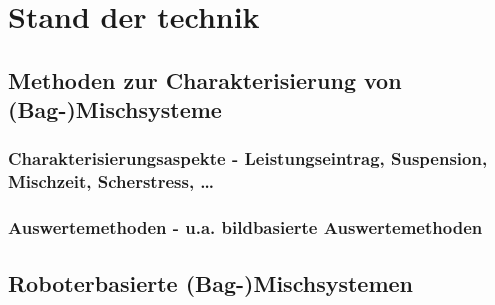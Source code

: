 \chapter{Stand der technik}
\section{Methoden zur Charakterisierung von (Bag-)Mischsysteme}
\subsection{Charakterisierungsaspekte - Leistungseintrag, Suspension, Mischzeit, Scherstress, …}
\subsection{Auswertemethoden - u.a. bildbasierte Auswertemethoden}
\section{Roboterbasierte (Bag-)Mischsystemen}